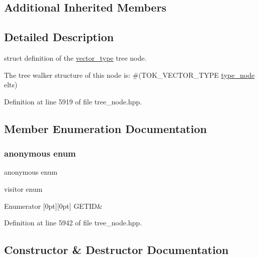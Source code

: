 \subsection*{Additional Inherited Members}


\subsection{Detailed Description}
struct definition of the \hyperlink{structvector__type}{vector\+\_\+type} tree node. 

The tree walker structure of this node is\+: \#(T\+O\+K\+\_\+\+V\+E\+C\+T\+O\+R\+\_\+\+T\+Y\+PE \hyperlink{structtype__node}{type\+\_\+node} elts) 

Definition at line 5919 of file tree\+\_\+node.\+hpp.



\subsection{Member Enumeration Documentation}
\mbox{\label{structvector__type_af4d4c935f822ba820237a465ae270518}} 
\subsubsection{\texorpdfstring{anonymous enum}{anonymous enum}}
{\footnotesize\ttfamily anonymous enum}



visitor enum 

\begin{DoxyEnumFields}{Enumerator}
[0pt][0pt]{}\mbox{\label{structvector__type_af4d4c935f822ba820237a465ae270518a21156e5d2fb3973025856725b07f2648}} 
G\+E\+T\+ID&\\
\hline

\end{DoxyEnumFields}


Definition at line 5942 of file tree\+\_\+node.\+hpp.



\subsection{Constructor \& Destructor Documentation}
\mbox{\label{structvector__type_a07a949a0a22f75791b1f33ce92137998}} 
